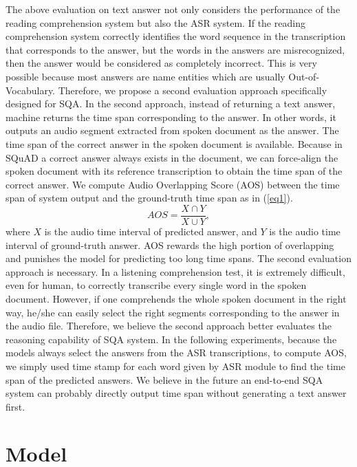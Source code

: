 \documentclass[a4paper]{article}
\begin{document}
The above evaluation on text answer not only considers the performance of the reading comprehension system but also the ASR system. 
If the reading comprehension system correctly identifies the word sequence in the transcription that corresponds to the answer, but the words in the answers are misrecognized, then the answer would be considered as completely incorrect. 
This is very possible because most answers are name entities which are usually Out-of-Vocabulary.
Therefore, we propose a second evaluation approach specifically designed for SQA.
In the second approach, instead of returning a text answer, machine returns the time span corresponding to the answer.
In other words, it outputs an audio segment extracted from spoken document as the answer. 
The time span of the correct answer in the spoken document is  available.
Because in SQuAD a correct answer always exists in the document, we can force-align the spoken document with its reference transcription to obtain the time span of the correct answer. 
We compute Audio Overlapping Score (AOS) between the  time span of system output and the ground-truth time span as in (\ref{eq1}).
\begin{equation}
AOS = \frac{X \cap Y}{X \cup Y},
  \label{eq1}
\end{equation}
where $X$ is the audio time interval of  predicted answer, and $Y$ is the audio time interval of ground-truth answer. 
AOS rewards the high portion of overlapping and punishes the model for predicting too long time spans. 
The second evaluation approach is necessary.
In a listening comprehension test, it is extremely difficult, even for human, to correctly transcribe every single word in the spoken document. 
However, if one comprehends the whole spoken document in the right way, he/she can easily select the right segments corresponding to the answer in the audio file.
Therefore, we believe the second approach better evaluates the reasoning capability of SQA system. In the following experiments, because the models always select the answers from the ASR transcriptions, to compute AOS, we simply used time stamp for each word given by ASR module to find the time span of the predicted answers.
We believe in the future an end-to-end SQA system can probably directly output time span without generating a text answer first.




\section{Model}
\end{document}
